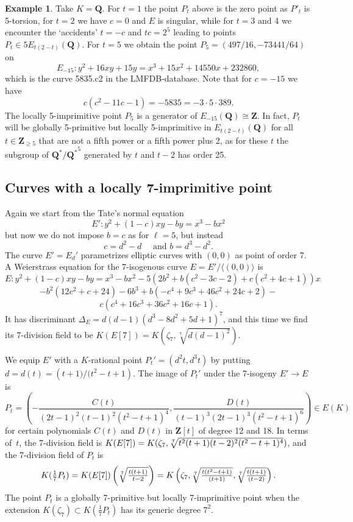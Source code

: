 \documentclass{amsart}
\theoremstyle{plain}
\theoremstyle{definition}
\newtheorem{example}[theorem]{Example}
\newcommand{\Que}{{\mathbf{Q}}}
\newcommand{\Zee}{{\mathbf{Z}}}
\newcommand{\iso}{\cong}
\begin{document}
\begin{example}
Take $K=\Que$.
For $t=1$ the point $P_t$ above is the zero point as 
$P'_t$ is 5-torsion,
for $t=2$ we have $c=0$ and $E$ is singular, while for
$t=3$ and 4 we encounter the `accidents' $t=-c$ and $tc=2^5$
leading to points $P_t\in 5E_{t(2-t)}(\Que)$.
For $t=5$ we obtain the point $P_5=(497/16, -73441/64)$ on 
\[
E_{-15}: y^2+16xy+15y=x^3+15x^2+14550x+232860,
\]
which is the curve 5835.c2 in the LMFDB-database.
Note that for $c=-15$ we have 
\[
c(c^2-11c-1)=-5835=-3\cdot5\cdot389.
\]
The locally 5-imprimitive point $P_5$ is a generator of 
$E_{-15}(\Que)\iso\Zee$.
In fact, $P_t$ will be globally 5-primitive but locally 5-imprimitive
in $E_{t(2-t)}(\Que)$ for all $t\in\Zee_{\ge5}$ that are not a fifth power
or a fifth power plus 2, as for these $t$ the subgroup of $\Que^*/{\Que^*}^5$
generated by $t$ and $t-2$ has order 25.
\end{example}

\subsection{Curves with a locally 7-imprimitive point}
Again we start from the Tate's normal equation
$$E': y^2+(1-c)xy-by=x^3-bx^2$$
but now we do not impose $b=c$ as for $\ell=5$, but instead
$$c=d^2-d\quad\text{ and } b=d^3-d^2.$$
The curve $E'=E_d'$ parametrizes \cite{Kulesz} elliptic curves 
with $(0,0)$ as point of order 7.
A Weierstrass equation for the 7-isogenous curve $E=E'/\langle(0,0)\rangle$ is
$$E: y^2+(1-c)xy-by=x^3-bx^2-5 \left(2 b^2+b \left(c^2-3 c-2\right)+c \left(c^2+4 c+1\right)\right)x$$
$$-b^2 \left(12 c^2+c+24\right)-6 b^3+b \left(-c^4+9 c^3+46 c^2+24 c+2\right)-$$
$$c \left(c^4+16 c^3+36 c^2+16 c+1\right).$$  
It has discriminant $\Delta_E=d(d-1)(d^3-8d^2+5d+1)^7$, and  
this time we find its 7-division field to be 
$
K(E[7])=K(\zeta_7,\sqrt[7]{d(d-1)^2}).
$ 

We equip $E'$ with a $K$-rational point $P_t'=(d^2t,d^3t)$
by putting $d=d(t)=({t+1)/(t^2-t+1})$.
The image of $P_t'$ under the 7-isogeny $E'\to E$ is
$$
P_t=\left(-\frac{C(t)}{(2 t-1)^2 (t-1)^2 \left(t^2-t+1\right)^4},\frac{D(t)}{(t-1)^3 (2 t-1)^3 \left(t^2-t+1\right)^6}\right)\in E(K)
$$ 
for certain polynomials $C(t)$ and $D(t)$ in $\Zee[t]$ 
of degree 12 and 18.
In terms of~$t$, the 7-division field is
$K(E[7])=K(\zeta_7, \root 7 \of {t^2(t+1)(t-2)^2(t^2-t+1)^4})$, 
and the 7-division field of $P_t$ is
\[
K(\textstyle \frac17 P_t)=
K(E[7])\left(\root 7\of {\frac{t(t+1)}{t-2}}\right)=
K\left(\zeta_7, \root 7 \of {\frac{t(t^2-t+1)}{(t+1)}},
           \root 7 \of {\frac{t(t+1)}{(t-2)}}\right).
\]
The point $P_t$ is a globally 7-primitive but 
locally 7-imprimitive point when the extension
$K(\zeta_7)\subset K(\frac17 P_t)$ has its generic degree $7^2$.
\end{document}
